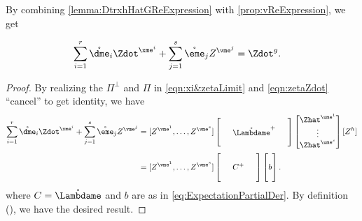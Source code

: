 \documentclass[main.tex]{subfiles}
\begin{document}
By combining \cref{lemma:DtrxhHatGReExpression} with \cref{prop:vReExpression}, we get
\begin{lemma}\label{lemma:hpartReExpression}
\begin{align*}
  \sum_{i=1}^r \mathring{\dme}_i \Zdot^{\xme^i}
  +
  \sum_{j=1}^s \mathring{\eme}_j  Z^{\vme^j}
    &=
    \Zdot^g.
\end{align*}
\end{lemma}
\begin{proof}
  By realizing the $\Pi^\perp$ and $\Pi$ in \cref{eqn:xi&zetaLimit} and \cref{eqn:zetaZdot} ``cancel'' to get identity, we have
\begin{align*}
  \sum_{i=1}^r \mathring{\dme}_i \Zdot^{\xme^i}
  +
  \sum_{j=1}^s \mathring{\eme}_j  Z^{\vme^j}
    &=
      [
         Z^{\vme^1},
        \ldots,
         Z^{\vme^s}
      ]
      \begin{bmatrix}
      \phz
        &\phz
          &\phz\\
      \phz
        &\mathring{\Lambdame }^+
          &\phz\\
      \phz
        &\phz
          &\phz
      \end{bmatrix}
      \begin{bmatrix}
      \Zhat^{\ume^1}\\
      \vdots\\
      \Zhat^{\ume^s}
      \end{bmatrix}
       [Z^{h}]
      \\
    &=
      [
         Z^{\vme^1},
        \ldots,
         Z^{\vme^s}
      ]
      \begin{bmatrix}
      \phz
        &\phz
          &\phz\\
      \phz
        &C^+
          &\phz\\
      \phz
        &\phz
          &\phz
      \end{bmatrix}
      \begin{bmatrix}
      \phz\\
      b\\
      \phz
      \end{bmatrix}
      .
  \end{align*}
where $C=\mathring \Lambdame$ and $b$ are as in \cref{eq:ExpectationPartialDer}.
By definition (), we have the desired result.
\end{proof}
\end{document}
